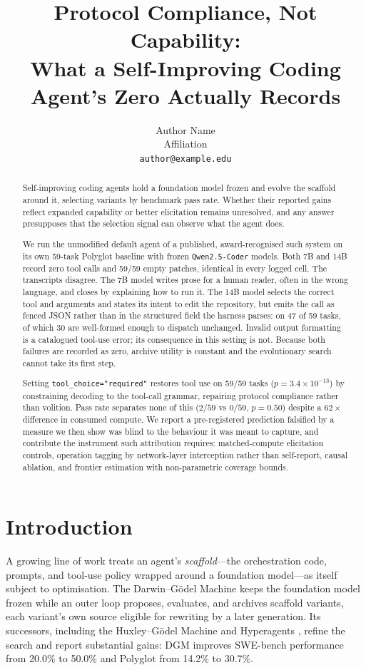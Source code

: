 \documentclass{article}
\title{Protocol Compliance, Not Capability:\\
What a Self-Improving Coding Agent's Zero Actually Records}
\author{%
  {Author Name} \\
  {Affiliation} \\
  \texttt{author@example.edu}
}
\begin{document}
\maketitle

\begin{abstract}
Self-improving coding agents hold a foundation model frozen and evolve the
scaffold around it, selecting variants by benchmark pass rate. Whether their
reported gains reflect expanded capability or better elicitation remains
unresolved, and any answer presupposes that the selection signal can observe
what the agent does.

We run the unmodified default agent of a published, award-recognised such
system on its own 59-task Polyglot baseline with frozen
\texttt{Qwen2.5-Coder} models. Both 7B and 14B record zero tool calls and
59/59 empty patches, identical in every logged cell. The transcripts
disagree. The 7B model writes prose for a human reader, often in the wrong
language, and closes by explaining how to run it. The 14B model selects the
correct tool and arguments and states its intent to edit the repository, but
emits the call as fenced JSON rather than in the structured field the harness
parses: on 47 of 59 tasks, of which 30 are well-formed enough to dispatch
unchanged. Invalid output formatting is a catalogued tool-use error; its
consequence in this setting is not. Because both failures are recorded as
zero, archive utility is constant and the evolutionary search cannot take its
first step.

Setting \texttt{tool\_choice="required"} restores tool use on 59/59 tasks
($p = 3.4\times10^{-13}$) by constraining decoding to the tool-call grammar,
repairing protocol compliance rather than volition. Pass rate separates none
of this ($2/59$ vs $0/59$, $p = 0.50$) despite a $62\times$ difference in
consumed compute. We report a pre-registered prediction falsified by a
measure we then show was blind to the behaviour it was meant to capture, and
contribute the instrument such attribution requires: matched-compute
elicitation controls, operation tagging by network-layer interception rather
than self-report, causal ablation, and frontier estimation with
non-parametric coverage bounds.
\end{abstract}

\section{Introduction}

A growing line of work treats an agent's \emph{scaffold}---the orchestration
code, prompts, and tool-use policy wrapped around a foundation model---as itself
subject to optimisation. The Darwin--G\"odel Machine
\citep{zhang2025dgm} keeps the foundation model frozen while an outer loop
proposes, evaluates, and archives scaffold variants, each variant's own source
eligible for rewriting by a later generation. Its successors, including the
Huxley--G\"odel Machine \citep{qin2025hgm} and Hyperagents
\citep{zhang2026hyperagents}, refine the search and report substantial gains:
DGM improves SWE-bench performance from 20.0\% to 50.0\% and Polyglot from
14.2\% to 30.7\%.
\end{document}
